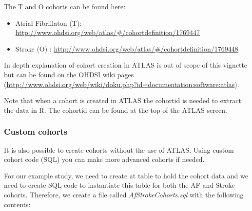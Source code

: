 \documentclass[]{book}
\providecommand{\tightlist}{%
  \setlength{\itemsep}{0pt}\setlength{\parskip}{0pt}}
\begin{document}
The T and O cohorts can be found here:

\begin{itemize}
\tightlist
\item
  Atrial Fibrillaton (T):
  \url{http://www.ohdsi.org/web/atlas/\#/cohortdefinition/1769447}
\item
  Stroke (O) :
  \url{http://www.ohdsi.org/web/atlas/\#/cohortdefinition/1769448}
\end{itemize}

In depth explanation of cohort creation in ATLAS is out of scope of this
vignette but can be found on the OHDSI wiki pages
(\url{http://www.ohdsi.org/web/wiki/doku.php?id=documentation:software:atlas}).

Note that when a cohort is created in ATLAS the cohortid is needed to
extract the data in R. The cohortid can be found at the top of the ATLAS
screen.

\subsubsection{Custom cohorts}\label{custom-cohorts}

It is also possible to create cohorts without the use of ATLAS. Using
custom cohort code (SQL) you can make more advanced cohorts if needed.

For our example study, we need to create at table to hold the cohort
data and we need to create SQL code to instantiate this table for both
the AF and Stroke cohorts. Therefore, we create a file called
\emph{AfStrokeCohorts.sql} with the following contents:
\end{document}
